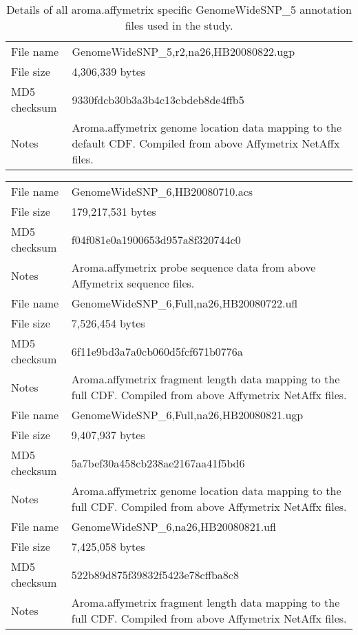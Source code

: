 \documentclass[10pt,a4paper]{article}
\begin{document}
\begin{table}[hp]
\begin{center}
\begin{tabular}{lp{}}
\hline
File name    & GenomeWideSNP\_5,r2,na26,HB20080822.ugp \\
File size    & 4,306,339 bytes \\
MD5 checksum & 9330fdcb30b3a3b4c13cbdeb8de4ffb5 \\
Notes        & Aroma.affymetrix genome location data mapping to the default CDF.  Compiled from above Affymetrix NetAffx files. \\
\hline
\end{tabular}
\end{center}
\caption{Details of all aroma.affymetrix specific GenomeWideSNP\_5 annotation files used in the study.}
\label{tblGWSFiveAromaAffymetrix}
\end{table}



\begin{table}[hp]
\begin{center}
\begin{tabular}{lp{}}
\hline
File name    & GenomeWideSNP\_6,HB20080710.acs \\
File size    & 179,217,531 bytes \\
MD5 checksum & f04f081e0a1900653d957a8f320744c0 \\
Notes        & Aroma.affymetrix probe sequence data from above Affymetrix sequence files. \\
\hline
File name    & GenomeWideSNP\_6,Full,na26,HB20080722.ufl \\
File size    & 7,526,454 bytes \\
MD5 checksum & 6f11e9bd3a7a0cb060d5fcf671b0776a \\
Notes        & Aroma.affymetrix fragment length data mapping to the full CDF.  Compiled from above Affymetrix NetAffx files. \\
\hline
File name    & GenomeWideSNP\_6,Full,na26,HB20080821.ugp \\
File size    & 9,407,937 bytes \\
MD5 checksum & 5a7bef30a458cb238ae2167aa41f5bd6 \\
Notes        & Aroma.affymetrix genome location data mapping to the full CDF.  Compiled from above Affymetrix NetAffx files. \\
\hline
File name    & GenomeWideSNP\_6,na26,HB20080821.ufl \\
File size    & 7,425,058 bytes \\
MD5 checksum & 522b89d875f39832f5423e78cffba8c8 \\
Notes        & Aroma.affymetrix fragment length data mapping to the full CDF.  Compiled from above Affymetrix NetAffx files. \\

\end{tabular}
\end{center}
\end{table}
\end{document}
